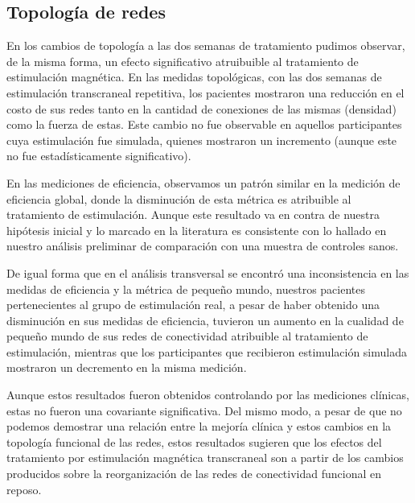 \subsection{Topología de redes}
En los cambios de topología a las dos semanas de tratamiento pudimos observar, de la misma forma, un efecto significativo atruibuible al tratamiento de estimulación magnética. En las medidas topológicas, con las dos semanas de estimulación transcraneal repetitiva, los pacientes mostraron una reducción en el costo de sus redes tanto en la cantidad de conexiones de las mismas (densidad) como la fuerza de estas. Este cambio no fue observable en aquellos participantes cuya estimulación fue simulada, quienes mostraron un incremento (aunque este no fue estadísticamente significativo).\par
En las mediciones de eficiencia, observamos un patrón similar en la medición de eficiencia global, donde la disminución de esta métrica es atribuible al tratamiento de estimulación. Aunque este resultado va en contra de nuestra hipótesis inicial y lo marcado en la literatura \parencite{Wang2015a} es consistente con lo hallado en nuestro análisis preliminar de comparación con una muestra de controles sanos. \par
De igual forma que en el análisis transversal se encontró una inconsistencia en las medidas de eficiencia y la métrica de pequeño mundo, nuestros pacientes pertenecientes al grupo de estimulación real, a pesar de haber obtenido una disminución en sus medidas de eficiencia, tuvieron un aumento en la cualidad de pequeño mundo de sus redes de conectividad atribuible al tratamiento de estimulación, mientras que los participantes que recibieron estimulación simulada mostraron un decremento en la misma medición. \par
Aunque estos resultados fueron obtenidos controlando por las mediciones clínicas, estas no fueron una covariante significativa. Del mismo modo, a pesar de que no podemos demostrar una relación entre la mejoría clínica y estos cambios en la topología funcional de las redes, estos resultados sugieren que los efectos del tratamiento por estimulación magnética transcraneal son a partir de los cambios producidos sobre la reorganización de las redes de conectividad funcional en reposo.

